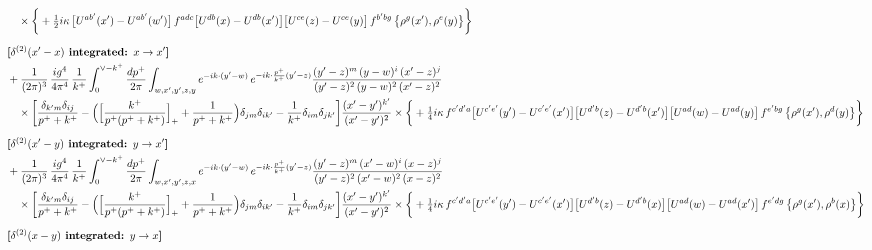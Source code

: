 \documentclass[10pt]{article}
\numberwithin{equation}{section}
\begin{document}
\begin{align}
&\quad\times\bigg\{+\tfrac12 i\kappa\,\big[U^{ab^{\prime}}(x^{\prime})-U^{ab^{\prime}}(w^{\prime})\big]\,f^{adc}\big[U^{db}(x)-U^{db}(x^{\prime})\big]\big[U^{ce}(z)-U^{ce}(y)\big]\,f^{b^{\prime}bg}\,\big\{\rho^{g}(x^{\prime}),\rho^{e}(y)\big\}\bigg\}\notag\\[6pt]
&\textbf{[$\delta^{(2)}(x^{\prime}-x)$ integrated: $x\to x^{\prime}$]}\notag\\
&+\frac{1}{(2\pi)^{3}}\,\frac{ig^{4}}{4\pi^{4}}\,\frac{1}{k^{+}}\int_{0}^{\vee-k^{+}}\frac{dp^{+}}{2\pi}\int_{w,x^{\prime},y^{\prime},z,y}e^{-ik\cdot(y^{\prime}-w)}\,e^{-ik\cdot\frac{p^{+}}{k^{+}}(y^{\prime}-z)}\frac{(y^{\prime}-z)^{m}\,(y-w)^{i}\,(x^{\prime}-z)^{j}}{(y^{\prime}-z)^{2}\,(y-w)^{2}\,(x^{\prime}-z)^{2}}\notag\\
&\quad\times\bigg[\frac{\delta_{k^{\prime}m}\delta_{ij}}{p^{+}+k^{+}}-\Big(\Big[\frac{k^{+}}{p^{+}(p^{+}+k^{+})}\Big]_{+}+\frac{1}{p^{+}+k^{+}}\Big)\delta_{jm}\delta_{ik^{\prime}}-\frac{1}{k^{+}}\delta_{im}\delta_{jk^{\prime}}\bigg]\frac{(x^{\prime}-y^{\prime})^{k^{\prime}}}{(x^{\prime}-y^{\prime})^{2}}\times\bigg\{+\tfrac14 i\kappa\,f^{c^{\prime}d^{\prime}a}\big[U^{c^{\prime}e^{\prime}}(y^{\prime})-U^{c^{\prime}e^{\prime}}(x^{\prime})\big]\big[U^{d^{\prime}b}(z)-U^{d^{\prime}b}(x^{\prime})\big]\big[U^{ad}(w)-U^{ad}(y)\big]\,f^{e^{\prime}bg}\,\big\{\rho^{g}(x^{\prime}),\rho^{d}(y)\big\}\bigg\}\notag\\[6pt]
&\textbf{[$\delta^{(2)}(x^{\prime}-y)$ integrated: $y\to x^{\prime}$]}\notag\\
&+\frac{1}{(2\pi)^{3}}\,\frac{ig^{4}}{4\pi^{4}}\,\frac{1}{k^{+}}\int_{0}^{\vee-k^{+}}\frac{dp^{+}}{2\pi}\int_{w,x^{\prime},y^{\prime},z,x}e^{-ik\cdot(y^{\prime}-w)}\,e^{-ik\cdot\frac{p^{+}}{k^{+}}(y^{\prime}-z)}\frac{(y^{\prime}-z)^{m}\,(x^{\prime}-w)^{i}\,(x-z)^{j}}{(y^{\prime}-z)^{2}\,(x^{\prime}-w)^{2}\,(x-z)^{2}}\notag\\
&\quad\times\bigg[\frac{\delta_{k^{\prime}m}\delta_{ij}}{p^{+}+k^{+}}-\Big(\Big[\frac{k^{+}}{p^{+}(p^{+}+k^{+})}\Big]_{+}+\frac{1}{p^{+}+k^{+}}\Big)\delta_{jm}\delta_{ik^{\prime}}-\frac{1}{k^{+}}\delta_{im}\delta_{jk^{\prime}}\bigg]\frac{(x^{\prime}-y^{\prime})^{k^{\prime}}}{(x^{\prime}-y^{\prime})^{2}}\times\bigg\{+\tfrac14 i\kappa\,f^{c^{\prime}d^{\prime}a}\big[U^{c^{\prime}e^{\prime}}(y^{\prime})-U^{c^{\prime}e^{\prime}}(x^{\prime})\big]\big[U^{d^{\prime}b}(z)-U^{d^{\prime}b}(x)\big]\big[U^{ad}(w)-U^{ad}(x^{\prime})\big]\,f^{e^{\prime}dg}\,\big\{\rho^{g}(x^{\prime}),\rho^{b}(x)\big\}\bigg\}\notag\\[6pt]
&\textbf{[$\delta^{(2)}(x-y)$ integrated: $y\to x$]}\notag\\

\end{align}
\end{document}
